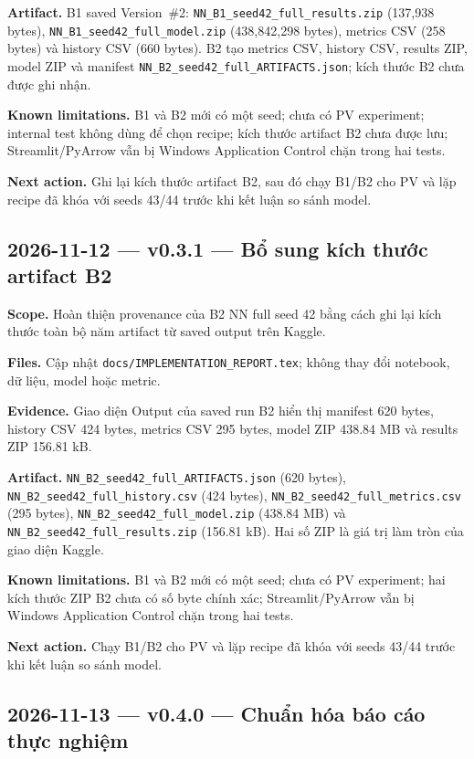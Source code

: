 \documentclass[11pt,a4paper]{article}
\newcommand{\code}[1]{\nolinkurl{#1}}
\begin{document}
\textbf{Artifact.} B1 saved Version~\#2: \code{NN_B1_seed42_full_results.zip} (137,938 bytes), \code{NN_B1_seed42_full_model.zip} (438,842,298 bytes), metrics CSV (258 bytes) và history CSV (660 bytes). B2 tạo metrics CSV, history CSV, results ZIP, model ZIP và manifest \code{NN_B2_seed42_full_ARTIFACTS.json}; kích thước B2 chưa được ghi nhận.

\textbf{Known limitations.} B1 và B2 mới có một seed; chưa có PV experiment; internal test không dùng để chọn recipe; kích thước artifact B2 chưa được lưu; Streamlit/PyArrow vẫn bị Windows Application Control chặn trong hai tests.

\textbf{Next action.} Ghi lại kích thước artifact B2, sau đó chạy B1/B2 cho PV và lặp recipe đã khóa với seeds 43/44 trước khi kết luận so sánh model.

\subsection*{2026-11-12 --- v0.3.1 --- Bổ sung kích thước artifact B2}

\textbf{Scope.} Hoàn thiện provenance của B2 NN full seed 42 bằng cách ghi lại kích thước toàn bộ năm artifact từ saved output trên Kaggle.

\textbf{Files.} Cập nhật \code{docs/IMPLEMENTATION_REPORT.tex}; không thay đổi notebook, dữ liệu, model hoặc metric.

\textbf{Evidence.} Giao diện Output của saved run B2 hiển thị manifest 620 bytes, history CSV 424 bytes, metrics CSV 295 bytes, model ZIP 438.84 MB và results ZIP 156.81 kB.

\textbf{Artifact.} \code{NN_B2_seed42_full_ARTIFACTS.json} (620 bytes), \code{NN_B2_seed42_full_history.csv} (424 bytes), \code{NN_B2_seed42_full_metrics.csv} (295 bytes), \code{NN_B2_seed42_full_model.zip} (438.84 MB) và \code{NN_B2_seed42_full_results.zip} (156.81 kB). Hai số ZIP là giá trị làm tròn của giao diện Kaggle.

\textbf{Known limitations.} B1 và B2 mới có một seed; chưa có PV experiment; hai kích thước ZIP B2 chưa có số byte chính xác; Streamlit/PyArrow vẫn bị Windows Application Control chặn trong hai tests.

\textbf{Next action.} Chạy B1/B2 cho PV và lặp recipe đã khóa với seeds 43/44 trước khi kết luận so sánh model.

\subsection*{2026-11-13 --- v0.4.0 --- Chuẩn hóa báo cáo thực nghiệm}
\end{document}
